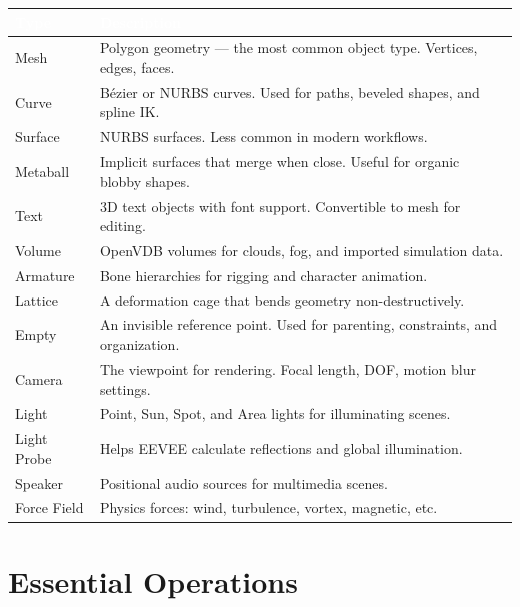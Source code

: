 \documentclass[11pt,letterpaper,twoside,openright]{book}
\newcommand{\tableheader}[1]{\textbf{\sffamily\textcolor{white}{#1}}}
\begin{document}
\begin{center}
\begin{tabularx}{\textwidth}{L{3cm}X}
\toprule
{}
\tableheader{Type} & \tableheader{Description} \\
\midrule
Mesh & Polygon geometry --- the most common object type. Vertices, edges, faces. \\
Curve & B\'{e}zier or NURBS curves. Used for paths, beveled shapes, and spline IK. \\
Surface & NURBS surfaces. Less common in modern workflows. \\
Metaball & Implicit surfaces that merge when close. Useful for organic blobby shapes. \\
Text & 3D text objects with font support. Convertible to mesh for editing. \\
Volume & OpenVDB volumes for clouds, fog, and imported simulation data. \\
Armature & Bone hierarchies for rigging and character animation. \\
Lattice & A deformation cage that bends geometry non-destructively. \\
Empty & An invisible reference point. Used for parenting, constraints, and organization. \\
Camera & The viewpoint for rendering. Focal length, DOF, motion blur settings. \\
Light & Point, Sun, Spot, and Area lights for illuminating scenes. \\
Light Probe & Helps EEVEE calculate reflections and global illumination. \\
Speaker & Positional audio sources for multimedia scenes. \\
Force Field & Physics forces: wind, turbulence, vortex, magnetic, etc. \\
\bottomrule
\end{tabularx}
\end{center}

\section{Essential Operations}
\end{document}
